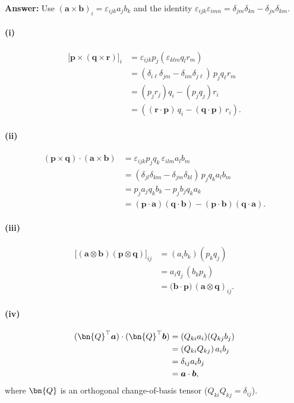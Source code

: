 \bigskip 
\textbf{Answer:}
Use $(\bm{a}\times\bm{b})_i=\varepsilon_{ijk}a_j b_k$ and the identity 
$\varepsilon_{ijk}\varepsilon_{imn}=\delta_{jm}\delta_{kn}-\delta_{jn}\delta_{km}$.

\paragraph{(i)}
\begin{align*}
\big[\bm{p}\times(\bm{q}\times\bm{r})\big]_i 
&= \varepsilon_{ijk}p_j(\varepsilon_{klm}q_l r_m) \\
&= (\delta_{i\ell}\delta_{jm}-\delta_{im}\delta_{j\ell})\,p_j q_\ell r_m \\
&= (p_j r_j)q_i-(p_j q_j)r_i \\
&=((\bm{r}\cdot\bm{p})\,q_i - (\bm{q}\cdot\bm{p})\,r_i).
\end{align*}

\paragraph{(ii)}
\begin{align*}
(\bm{p}\times\bm{q})\cdot(\bm{a}\times\bm{b})
&=\varepsilon_{ijk}p_j q_k\,\varepsilon_{ilm}a_l b_m \\
&=(\delta_{jl}\delta_{km}-\delta_{jm}\delta_{kl})\,p_j q_k a_l b_m \\
&=p_j a_j q_k b_k-p_j b_j q_k a_k\\
&=(\bm{p}\cdot\bm{a})(\bm{q}\cdot\bm{b})-(\bm{p}\cdot\bm{b})(\bm{q}\cdot\bm{a}).
\end{align*}

\paragraph{(iii)}
\begin{align*}
\big[(\bm{a}\otimes\bm{b})(\bm{p}\otimes\bm{q})\big]_{ij}
&=(a_i b_k)(p_k q_j) \\
&=a_i q_j\,(b_k p_k) \\
&=\big(\bm{b}\cdot\bm{p}\big)\,(\bm{a}\otimes\bm{q})_{ij}.
\end{align*}

\paragraph{(iv)}
\begin{align*}
(\bn{Q}^\top\bm{a})\cdot(\bn{Q}^\top\bm{b})
&=(Q_{ki}a_i)(Q_{kj}b_j) \\
&=(Q_{ki}Q_{kj})\,a_i b_j \\
&=\delta_{ij}a_i b_j \\
&=\bm{a}\cdot\bm{b},
\end{align*}
where $\bn{Q}$ is an orthogonal change-of-basis tensor ($Q_{ki}Q_{kj}=\delta_{ij}$).
\bigskip

